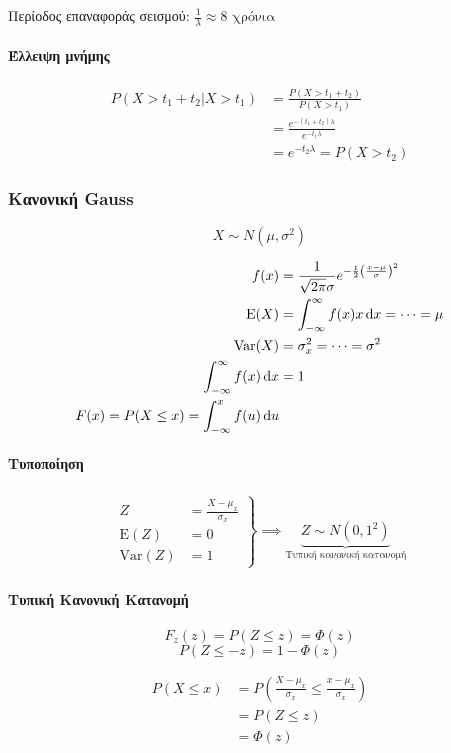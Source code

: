 \documentclass[11pt,a4paper,titlepage,draft]{article}
\newcommand{\textlatin}[1]{#1}
\begin{document}
Περίοδος επαναφοράς σεισμού: \(\frac{1}{\lambda } \approx 8 \text{ χρόνια}\)

\paragraph{Έλλειψη μνήμης}
\begin{align*}
P(X > t_1 + t_2 | X > t_1) &= \frac{P(X>t_1+t_2)}{P(X>t_1)}
\\ &= \frac{e^{-(t_1+t_2)\lambda }}{e^{-t_1 \lambda }} \\
&= e^{-t_2\lambda } = P(X> t_2)
\end{align*}

\subsubsection{Κανονική \textlatin{Gauss}}
\[
X \sim N(\mu, \sigma^2)
\]

\begin{align*}
f(x) &= \frac{1}{\sqrt{2\pi}\sigma} e^{-\frac{1}{2} \left(\frac{x-\mu}{\sigma} \right)^2 }\\
\mathrm E(X) &= \int_{-\infty}^\infty f(x) x \dif x = \dots = \mu\\
\mathrm{Var}(X) &= \sigma_x^2 = \dots = \sigma^2 \\
\int_{-\infty}^\infty f(x) \dif x &= 1 \\
F(x) = P(X \leq x) = \int_{-\infty}^x f(u) \dif u
\end{align*}

\paragraph{Τυποποίηση} \begin{align*}
\left. \begin{array}{rl}
Z &= \frac{X-\mu_x}{\sigma_x} \\
\mathrm E(Z) &= 0 \\
\mathrm{Var}(Z) &= 1
\end{array} \right\rbrace \implies \underbrace{Z \sim N(0,1^2)}_{\text{Τυπική κανονική κατανομή}}
\end{align*}

\paragraph{Τυπική Κανονική Κατανομή}
\[
F_z(z) = P(Z \leq z) = \Phi(z)
\]
\[
P(Z \leq -z) = 1 - \Phi(z)
\]

\begin{align*}
P(X \leq x) &= P \left(
\frac{X-\mu_x}{\sigma_x} \leq \frac{x-\mu_x}{\sigma_x}
\right)  \\
&= P(Z \leq z) \\ &= \Phi(z)
\end{align*}
\end{document}

